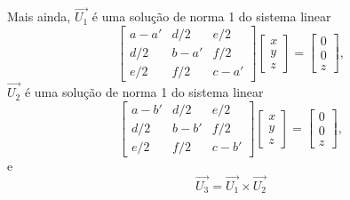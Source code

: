 \begin{teorema}
  Mais ainda, $\vec{U_1}$ \'e uma solu\c{c}\~ao de norma 1 do sistema linear
  \[
    \begin{bmatrix}
      a - a' & d/2 & e/2\\
      d/2 & b - a' & f/2\\
      e/2 & f/2 & c - a'
    \end{bmatrix} \begin{bmatrix}
      x\\y\\z
    \end{bmatrix} = \begin{bmatrix}
      0\\0\\z
    \end{bmatrix},
  \]
  $\vec{U_2}$ \'e uma solu\c{c}\~ao de norma 1 do sistema linear
  \[
    \begin{bmatrix}
      a - b' & d/2 & e/2\\
      d/2 & b - b' & f/2\\
      e/2 & f/2 & c - b'
    \end{bmatrix} \begin{bmatrix}
      x\\y\\z
    \end{bmatrix} = \begin{bmatrix}
      0\\0\\z
    \end{bmatrix},
  \]
  e
  \[
  	\vec{U_3} = \vec{U_1} \times \vec{U_2}
  \]
\end{teorema}

